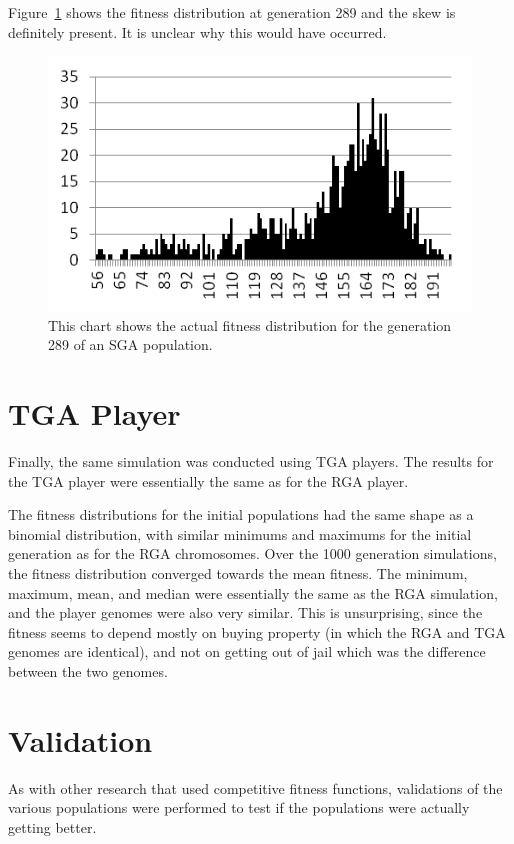 Figure~\ref{figure-sga_gen289} shows the fitness distribution at generation 289
and the skew is definitely present. It is unclear why this would have occurred.

\begin{figure}[htp]
\centerline{\includegraphics[width=0.75\columnwidth]{Figures/sga_gen289.png}}
\caption[SGA Fitness Generation 289]{This chart shows the actual fitness
distribution for the generation 289 of an SGA population.}
\label{figure-sga_gen289}
\end{figure}

\section{TGA Player}

Finally, the same simulation was conducted using TGA players. The results for
the TGA player were essentially the same as for the RGA player.

The fitness distributions for the initial populations had the same shape as a
binomial distribution, with similar minimums and maximums for the initial
generation as for the RGA chromosomes. Over the 1000 generation simulations, the
fitness distribution converged towards the mean fitness. The minimum, maximum,
mean, and median were essentially the same as the RGA simulation, and the player
genomes were also very similar. This is unsurprising, since the fitness seems to
depend mostly on buying property (in which the RGA and TGA genomes are
identical), and not on getting out of jail which was the difference between the
two genomes.

\section{Validation}

As with other research that used competitive fitness functions, validations of
the various populations were performed to test if the populations were actually
getting better.

